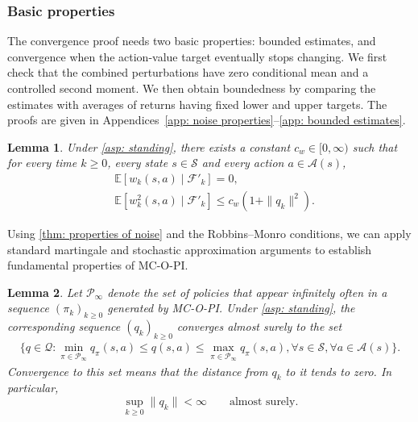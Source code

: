 \documentclass[twoside,11pt]{article}
\newtheorem{lemma}[lemma]{Lemma}
\newcommand{\qset}{\mathcal{Q}}
\newcommand{\aset}{\mathcal{A}}
\newcommand{\sset}{\mathcal{S}}
\newcommand{\polset}{\mathcal{P}}
\DeclareRobustCommand{\reviewbarstart}{%
  \ifhmode %
    \vadjust{\vbox to 0pt{%
      \vskip-\ht\strutbox %
      \vskip-\dp\strutbox %
      \cbstart[\changebarwidth] %
      \vss %
    }}%
  \else %
    \cbstart[\changebarwidth]%
  \fi %
} %
\providecommand{\DIFadd}[1]{#1} %
\providecommand{\DIFaddbegin}{\reviewbarstart} %
\providecommand{\DIFaddend}{\protect\cbend} %
\def\DIFadd#1{#1}%
\def\DIFaddbegin{}%
\def\DIFaddend{}%
\begin{document}
 \subsubsection{Basic properties}
 \DIFaddbegin \label{sec: replacement foundations}
\DIFadd{The convergence proof needs two basic properties: bounded estimates, and convergence when the action-value target eventually stops changing.
We first check that the combined perturbations have zero conditional mean and a controlled }\DIFaddend second moment. \DIFaddbegin \DIFadd{We then obtain boundedness by comparing the estimates with averages of returns having fixed lower and upper targets. The proofs are given in Appendices~\ref{app: noise properties}--\ref{app: bounded estimates}.
}\DIFaddend 

\begin{lemma}
\label{thm: properties of noise}
 \DIFaddbegin \DIFadd{Under \autoref{asp: standing}, there }\DIFaddend exists a constant $c_w \in [0, \infty)$
such that for every time $k \ge 0$, every state $s \in \sset$ and every action $a \in \aset(s)$,
 \DIFaddbegin \begin{align}
\DIFadd{\label{eq: muw_mds}
}&\DIFadd{\mathbb E\!\left[w_k(s,a) \mid \mathcal F'_k\right] = 0,
}\\
\DIFadd{\label{eq: muw_second_moment}
}&\DIFadd{\mathbb E\!\left[w_k^2(s,a) \mid \mathcal F'_k\right]
\le c_w(1+\|q_k\|^2) .
}\end{align}\DIFaddend 
\end{lemma}

Using \autoref{thm: properties of noise} and the Robbins--Monro conditions,
we can apply standard martingale and stochastic approximation arguments to establish fundamental properties of MC-O-PI.

 \begin{lemma}
\label{thm: bounded limit sets}
Let $\polset_\infty$ denote the set of policies that appear infinitely often in a sequence $(\pi_k)_{k \ge 0}$ generated by MC-O-PI.
 \DIFaddbegin \DIFadd{Under \autoref{asp: standing}, the }\DIFaddend corresponding sequence $(q_k)_{k \ge 0}$ converges almost surely to the set
 \DIFaddbegin \begin{align*}
    \DIFadd{\Big\{
    q \in \qset :
    \min_{\pi \in \polset_\infty} q_\pi(s,a) \leq q(s,a) \leq \max_{\pi \in \polset_\infty} q_\pi(s,a), \forall s \in \sset, \forall a \in \aset(s)
    \Big\} .
}\end{align*}\DIFaddend 
 \DIFaddbegin \DIFadd{Convergence to this set means that the distance from $q_k$ to it tends to zero. In particular,
}\[
\DIFadd{\sup_{k\ge0}\|q_k\|<\infty\qquad\text{almost surely}.
}\]\DIFaddend 
\end{lemma}
\end{document}
